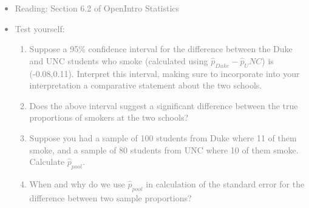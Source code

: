 \documentclass[11pt]{article}
\newcommand{\gray}[1]{\textcolor{gray}{#1}}
\begin{document}
\gray{
{\it
\vspace{-0.55cm}
\begin{itemize}
\renewcommand{\labelitemi}{{\textcolor{dark}{$\ast$}}}
\item Reading: Section 6.2 of OpenIntro Statistics
\item Test yourself:
\begin{enumerate}
\item Suppose a 95\% confidence interval for the difference between the Duke and UNC students who smoke (calculated using $\hat{p}_{Duke} - \hat{p}_UNC$) is (-0.08,0.11). Interpret this interval, making sure to incorporate into your interpretation a comparative statement about the two schools.
\item Does the above interval suggest a significant difference between the true proportions of smokers at the two schools?
\item Suppose you had a sample of 100 students from Duke where 11 of them smoke, and a sample of 80 students from UNC where 10 of them smoke. Calculate $\hat{p}_{pool}$.
\item When and why do we use $\hat{p}_{pool}$ in calculation of the standard error for the difference between two sample proportions?
\end{enumerate}
\end{itemize}
}}


%

\vspace{0.48cm}

%
\end{document}
